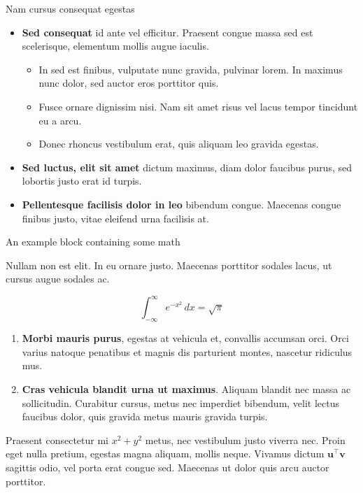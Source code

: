 \documentclass[final]{beamer}
\newlength{\colwidth}
\begin{document}
\begin{frame}[t]
\begin{columns}[t]
\begin{column}{\colwidth}
\begin{block}{Nam cursus consequat egestas}
				\begin{itemize}
					\item \textbf{Sed consequat} id ante vel efficitur. Praesent congue massa
					sed est scelerisque, elementum mollis augue iaculis.
					\begin{itemize}
						\item In sed est finibus, vulputate
						nunc gravida, pulvinar lorem. In maximus nunc dolor, sed auctor eros
						porttitor quis.
						\item Fusce ornare dignissim nisi. Nam sit amet risus vel lacus
						tempor tincidunt eu a arcu.
						\item Donec rhoncus vestibulum erat, quis aliquam leo
						gravida egestas.
					\end{itemize}
					\item \textbf{Sed luctus, elit sit amet} dictum maximus, diam dolor
					faucibus purus, sed lobortis justo erat id turpis.
					\item \textbf{Pellentesque facilisis dolor in leo} bibendum congue.
					Maecenas congue finibus justo, vitae eleifend urna facilisis at.
				\end{itemize}
				
			\end{block}
			
			\begin{exampleblock}{An example block containing some math}{}
				
				Nullam non est elit. In eu ornare justo. Maecenas porttitor sodales lacus,
				ut cursus augue sodales ac.
				
				$$
				\int_{-\infty}^{\infty} e^{-x^2}\,dx = \sqrt{\pi}
				$$
				
				\begin{enumerate}
					\item \textbf{Morbi mauris purus}, egestas at vehicula et, convallis
					accumsan orci. Orci varius natoque penatibus et magnis dis parturient
					montes, nascetur ridiculus mus.
					\item \textbf{Cras vehicula blandit urna ut maximus}. Aliquam blandit nec
					massa ac sollicitudin. Curabitur cursus, metus nec imperdiet bibendum,
					velit lectus faucibus dolor, quis gravida metus mauris gravida turpis.
				\end{enumerate}
				
				
				Praesent consectetur mi $x^2 + y^2$ metus, nec vestibulum justo viverra
				nec. Proin eget nulla pretium, egestas magna aliquam, mollis neque. Vivamus
				dictum $\mathbf{u}^\intercal\mathbf{v}$ sagittis odio, vel porta erat
				congue sed. Maecenas ut dolor quis arcu auctor porttitor.
				

\end{exampleblock}
\end{column}
\end{columns}
\end{frame}
\end{document}
